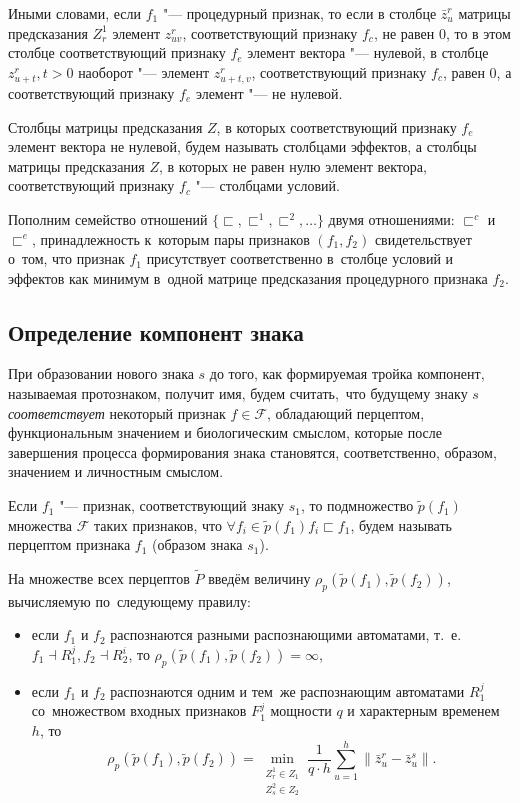 Иными словами, если $f_1$ "--- процедурный признак, то если в столбце $\bar z_u^r$ матрицы предсказания $Z_r^1$ элемент $z_{uv}^r$, соответствующий признаку $f_c$, не равен $0$, то в этом столбце соответствующий признаку $f_e$ элемент вектора "--- нулевой, в столбце $z_{u+t}^r, t>0$ наоборот "--- элемент $z_{u+t,v}^r$, соответствующий признаку $f_c$, равен $0$, а соответствующий признаку $f_e$ элемент "--- не нулевой.

\begin{Def}
	Столбцы матрицы предсказания $Z$, в которых соответствующий признаку $f_e$ элемент вектора не нулевой, будем называть столбцами эффектов, а столбцы матрицы предсказания $Z$, в которых не равен нулю элемент вектора, соответствующий признаку $f_c$ "--- столбцами условий. 
\end{Def}

Пополним семейство отношений $\{\sqsubset,\sqsubset^1,\sqsubset^2,\dots\}$ двумя отношениями: $\sqsubset^c$ и $\sqsubset^e$, принадлежность к~которым пары признаков $(f_1,f_2)$ свидетельствует о~том, что признак $f_1$ присутствует соответственно в~столбце условий и эффектов как минимум в~одной матрице предсказания процедурного признака $f_2$.

\subsection{Определение компонент знака}

При образовании нового знака $s$ до того, как формируемая тройка компонент, называемая протознаком, получит имя, будем считать,~что будущему знаку $s$ \textit{соответствует} некоторый признак $f\in\mathcal F$, обладающий перцептом, функциональным значением и биологическим смыслом, которые после завершения процесса формирования знака становятся, соответственно, образом, значением и личностным смыслом.
\begin{Def}
	Если $f_1$ "--- признак, соответствующий знаку $s_1$, то подмножество $\tilde p(f_1)$ множества $\mathcal F$ таких признаков, что $\forall f_i\in\tilde p(f_1) f_i\sqsubset f_1$, будем называть перцептом признака $f_1$ (образом знака $s_1$).
\end{Def}

На множестве всех перцептов $\tilde P$ введём величину $\rho_p(\tilde p(f_1),\tilde p(f_2))$, вычисляемую по~следующему правилу:
\begin{itemize}
	\item если $f_1$ и $f_2$ распознаются разными распознающими автоматами, т.~е. $f_1\dashv R_1^j, f_2\dashv R_2^i$, то $\rho_p(\tilde p(f_1),\tilde p(f_2))=\infty$,
	\item если $f_1$ и $f_2$ распознаются одним и тем~же распознающим автоматами $R_1^j$ со~множеством входных признаков $F_1^j$ мощности $q$ и характерным временем $h$, то
	\begin{equation}
		\rho_p(\tilde p(f_1),\tilde p(f_2))=\min\limits_{\substack{Z_r^1\in Z_1\\Z_s^2\in Z_2}}\frac{1}{q\cdot h}\sum\limits_{u=1}^h\|\bar z_u^r-\bar z_u^s\|.
	\end{equation} 
\end{itemize}

